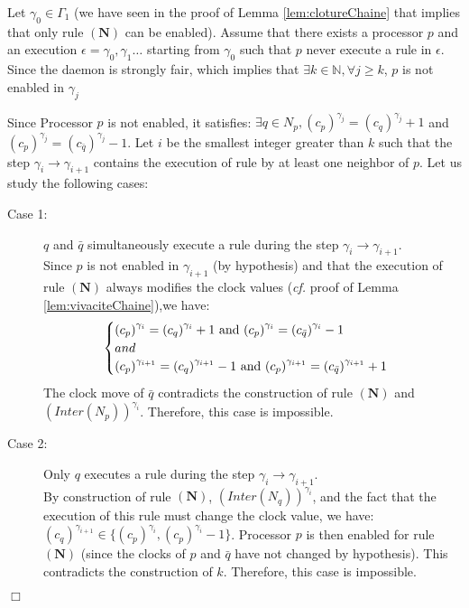 \documentclass[11pt,english,letterpaper]{article}
\newenvironment{proof}{{\noindent\bf Proof. } }{{\hfill $\Box$}}
\begin{document}
\begin{proof}
Let $\gamma_{0}\in\Gamma_{1}$ (we have seen in the proof of Lemma \ref{lem:clotureChaine} that implies that only rule $\boldsymbol{(N)}$ can be enabled). Assume that there exists a processor $p$ and an execution $\epsilon=\gamma_{0},\gamma_{1}\ldots$ starting from $\gamma_{0}$ such that $p$ never execute a rule in $\epsilon$. Since the daemon is strongly fair, which implies that $\exists k\in\mathbb{N},\forall j\geq k$, $p$ is not enabled in $\gamma_{j}$

Since Processor $p$ is not enabled, it satisfies: $\exists q\in N_{p},\left(c_{p}\right)^{\gamma_{j}}=\left(c_{q}\right)^{\gamma_{j}}+1$ and $\left(c_{p}\right)^{\gamma_{j}}=\left(c_{\bar{q}}\right)^{\gamma_{j}}-1$. Let $i$ be the smallest integer greater than $k$ such that the step $\gamma_{i}\rightarrow\gamma_{i+1}$ contains the execution of rule by at least one neighbor of $p$. Let us study the following cases:

\begin{description}
\item[Case 1:] $q$ and $\bar{q}$ simultaneously execute a rule during the step $\gamma_{i}\rightarrow\gamma_{i+1}$.\\
Since $p$ is not enabled in $\gamma_{i+1}$ (by hypothesis) and that the execution of rule $\boldsymbol{(N)}$ always modifies the clock values (\emph{cf.}	proof of Lemma \ref{lem:vivaciteChaine}),we have: 
\[\begin{cases}\left(c_{p}\right)^{\gamma_{i}}=\left(c_{q}\right)^{\gamma_{i}}+1$ and $\left(c_{p}\right)^{\gamma_{i}}=\left(c_{\bar{q}}\right)^{\gamma_{i}}-1\\
and\\
\left(c_{p}\right)^{\gamma_{i+1}}=\left(c_{q}\right)^{\gamma_{i+1}}-1$ and $\left(c_{p}\right)^{\gamma_{i+1}}=\left(c_{\bar{q}}\right)^{\gamma_{i+1}}+1\end{cases}\]
The clock move of $\bar{q}$ contradicts the construction of rule $\boldsymbol{(N)}$ and $\left(Inter(N_{p})\right)^{\gamma_{i}}$. Therefore, this case is impossible.

\item[Case 2:] Only $q$ executes a rule during the step $\gamma_{i}\rightarrow\gamma_{i+1}$.\\
By construction of rule $\boldsymbol{(N)}$, $\left(Inter(N_{q})\right)^{\gamma_{i}}$, and the fact that the execution of this rule must change the clock value, we have: $\left(c_{q}\right)^{\gamma_{i+1}}\in\{\left(c_{p}\right)^{\gamma_{i}},\left(c_{p}\right)^{\gamma_{i}}-1\}$. Processor $p$ is then enabled for rule $\boldsymbol{(N)}$ (since the clocks of $p$ and $\bar{q}$ have not changed by hypothesis). This contradicts the construction of $k$. Therefore, this case is impossible.


\end{description}
\end{proof}
\end{document}
